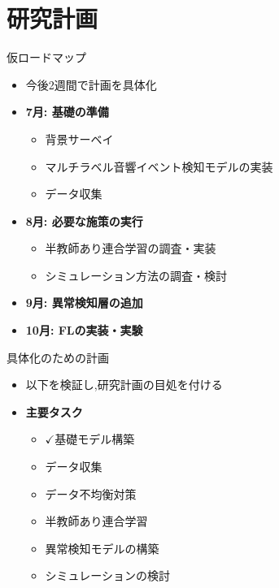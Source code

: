 \documentclass[unicode,12pt,aspectratio=169,dvipdfmx]{beamer}
\begin{document}
\section{研究計画}
\begin{frame}{仮ロードマップ}
  \begin{itemize}
    \item 今後2週間で計画を具体化
    \item \textbf{7月: 基礎の準備}
    \begin{itemize}
        \item 背景サーベイ
        \item マルチラベル音響イベント検知モデルの実装
        \item データ収集
    \end{itemize}
    \item \textbf{8月: 必要な施策の実行}
    \begin{itemize}
        \item 半教師あり連合学習の調査・実装
        \item シミュレーション方法の調査・検討
    \end{itemize}
    \item \textbf{9月: 異常検知層の追加}
    \item \textbf{10月: FLの実装・実験}

  \end{itemize}
\end{frame}

\begin{frame}{具体化のための計画}
  \begin{itemize}
    \item 以下を検証し,研究計画の目処を付ける
    \item \textbf{主要タスク}
    \begin{itemize}
        \item $\checkmark$基礎モデル構築
        \item データ収集
        \item データ不均衡対策
        \item 半教師あり連合学習
        \item 異常検知モデルの構築
        \item シミュレーションの検討
    \end{itemize}
  \end{itemize}
\end{frame}

\end{document}
